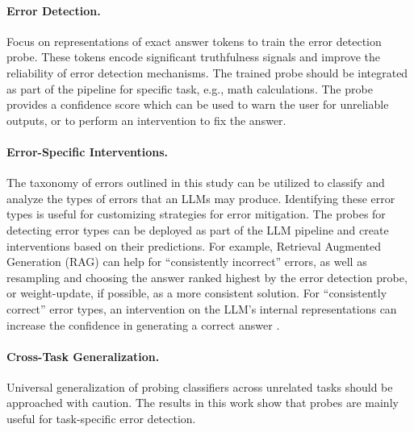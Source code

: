 \documentclass{article} %
\begin{document}
\paragraph{Error Detection.} Focus on representations of exact answer tokens to train the error detection probe. These tokens encode significant truthfulness signals and improve the reliability of error detection mechanisms. The trained probe should be integrated as part of the pipeline for specific task, e.g., math calculations.
The probe provides a confidence score which can be used to warn the user for unreliable outputs, or to perform an intervention to fix the answer.

\paragraph{Error-Specific Interventions.} The taxonomy of errors outlined in this study can be utilized to classify and analyze the types of errors that an LLMs may produce.
Identifying these error types is useful for customizing strategies for error mitigation.
The probes for detecting error types can be deployed as part of the LLM pipeline and create interventions based on their predictions.
For example, Retrieval Augmented Generation (RAG) \citep{lewis2020retrieval} can help for ``consistently incorrect'' errors, as well as resampling and choosing the answer ranked highest by the error detection probe, or weight-update, if possible, as a more consistent solution.
For ``consistently correct'' error types, an intervention on the LLM's internal representations can increase the confidence in generating a correct answer \citep{simhi2024constructing}.

\paragraph{Cross-Task Generalization.} Universal generalization of probing classifiers across unrelated tasks should be approached with caution. The results in this work show that probes are mainly useful for task-specific error detection.
\end{document}
